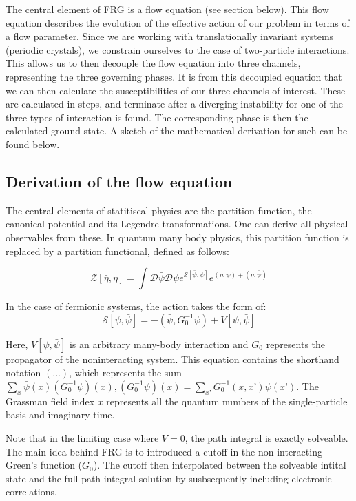 \documentclass[12pt]{article}
\begin{document}
The central element of FRG is a flow equation (see section below). This flow equation describes the evolution of the effective action of our problem in terms of a flow parameter. Since we are working with translationally invariant systems (periodic crystals), we constrain ourselves to the case of two-particle interactions. This allows us to then decouple the flow equation into three channels, representing the three governing phases.
It is from this decoupled equation that we can then calculate the susceptibilities of our three channels of interest. These are calculated in steps, and terminate after a diverging instability for one of the three types of interaction is found. The corresponding phase is then the calculated ground state. A sketch of the mathematical derivation for such can be found below. 


\subsection{Derivation of the flow equation}
The central elements of statitiscal physics are the partition function, the canonical potential and its Legendre transformations. One can derive all physical observables from these. In quantum many body physics, this partition function is replaced by a partition functional, defined as follows:

\begin{equation}\label{partition functional}
    \mathcal{Z}[\bar{\eta}, \eta] = \int \mathcal{D} \bar{\psi} \mathcal{D}\psi e^{\mathcal{S}[\bar{\psi}, \psi]}e^{(\bar{\eta}, \psi)+(\eta, \bar{\psi})}
\end{equation}

In the case of fermionic systems, the action takes the form of:
\begin{equation} \label{action}
    \mathcal{S}[\psi, \bar{\psi}] = -(\bar{\psi}, G_0^{-1} \psi) + V[\psi, \bar{\psi}]
\end{equation}

Here, $V[\psi, \bar{\psi}]$ is an arbitrary many-body interaction and $G_0$ represents the propagator of the noninteracting system. This equation contains the shorthand notation $(...)$, which represents the sum $\sum_x \bar{\psi}(x)(G_0^{-1}\psi)(x), (G_0^{-1}\psi)(x) = \sum_{x’}G_0^{-1}(x,x’)\psi(x’)$. The Grassman field index $x$ represents all the quantum numbers of the single-particle basis and imaginary time.



Note that in the limiting case where $V=0$, the path integral is exactly solveable. The main idea behind FRG is to introduced a cutoff in the non interacting Green's function ($G_0$). The cutoff then interpolated between the solveable intital state and the full path integral solution by susbsequently including electronic correlations. 
\end{document}
